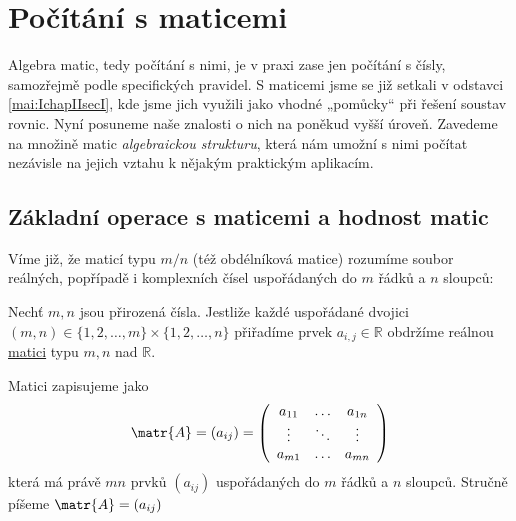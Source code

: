       

      
  \section{Počítání s maticemi}\label{mai:IchapIIsecIII}
    Algebra matic, tedy počítání s nimi, je v praxi zase jen počítání s čísly, samozřejmě podle
    specifických pravidel. S maticemi jsme se již setkali v odstavci \ref{mai:IchapIIsecI}, kde 
    jsme jich využili jako vhodné „pomůcky“ při řešení soustav rovnic. Nyní posuneme naše 
    znalosti o nich na poněkud vyšší úroveň. Zavedeme na množině matic \emph{algebraickou 
    strukturu}, která nám umožní s nimi počítat nezávisle na jejich vztahu k nějakým praktickým 
    aplikacím.
    \subsection{Základní operace s maticemi a hodnost matic}\label{mai:IchapIIsecIIIsubI}
      Víme již, že maticí typu \(m/n\) (též obdélníková matice) rozumíme soubor reálných,       
      popřípadě i komplexních čísel uspořádaných do \(m\) řádků a \(n\) sloupců:
      \begin{mdframed}[style=mdmathdef]
        \begin{definition}\label{def_matice}
          Nechť \(m, n\) jsou přirozená čísla. Jestliže každé uspořádané dvojici \((m,n)\in 
          \{1,2,\ldots,m\}\times \{1,2,\ldots,n\}\) přiřadíme prvek \(a_{i,j}\in\mathbb{R}\) 
          obdržíme reálnou \href{http://cs.wikipedia.org/wiki/Matice}{matici} typu \(m,n\) nad 
          \(\mathbb{R}\). 
          
          Matici zapisujeme jako
          \begin{equation}\label{matice_zapis}
            \matr{A} = \left(a_{ij}\right) =\left(
                                          \begin{array}{ccc}
                                            a_{11} & \ldots & a_{1n} \\
                                            \vdots & \ddots & \vdots \\
                                            a_{m1} & \ldots & a_{mn}
                                          \end{array}
                                     \right)
          \end{equation}
          která má právě \(mn\) prvků \((a_{ij})\) uspořádaných do \(m\) řádků a \(n\) sloupců. 
          Stručně píšeme \(\matr{A} = (a_{ij})\)
        \end{definition}
      \end{mdframed}

